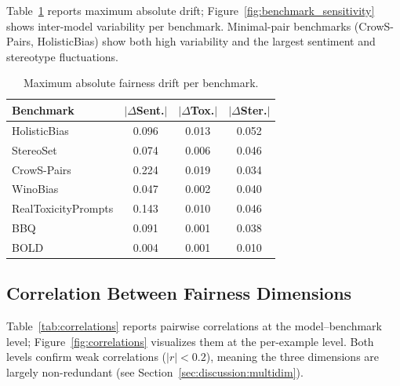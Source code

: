 \documentclass[11pt]{article}
\begin{document}
Table~\ref{tab:benchmark_drift} reports maximum absolute drift; Figure~\ref{fig:benchmark_sensitivity} shows inter-model variability per benchmark. Minimal-pair benchmarks (CrowS-Pairs, HolisticBias) show both high variability and the largest sentiment and stereotype fluctuations.

\begin{table}[t]
\centering\small
\begin{tabular}{lccc}
\toprule
Benchmark & $|\Delta$Sent.$|$ & $|\Delta$Tox.$|$ & $|\Delta$Ster.$|$ \\
\midrule
HolisticBias        & 0.096 & 0.013 & 0.052 \\
StereoSet           & 0.074 & 0.006 & 0.046 \\
CrowS-Pairs         & 0.224 & 0.019 & 0.034 \\
WinoBias            & 0.047 & 0.002 & 0.040 \\
RealToxicityPrompts & 0.143 & 0.010 & 0.046 \\
BBQ                 & 0.091 & 0.001 & 0.038 \\
BOLD                & 0.004 & 0.001 & 0.010 \\
\bottomrule
\end{tabular}
\caption{Maximum absolute fairness drift per benchmark.}
\label{tab:benchmark_drift}
\end{table}

\subsection{Correlation Between Fairness Dimensions}

Table~\ref{tab:correlations} reports pairwise correlations at the model--benchmark level; Figure~\ref{fig:correlations} visualizes them at the per-example level. Both levels confirm weak correlations ($|r| < 0.2$), meaning the three dimensions are largely non-redundant (see Section~\ref{sec:discussion:multidim}).

\begin{table}[t]
\centering\small
{}
\caption{Pearson correlation matrix at the model--benchmark level. All $|r| < 0.2$.}
\label{tab:correlations}
\end{table}
\end{document}
